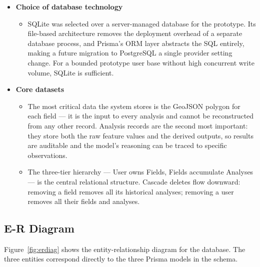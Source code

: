 \begin{itemize}
  \item \textbf{Choice of database technology}
    \begin{itemize}
      \item[-] SQLite was selected over a server-managed database for the prototype. Its file-based architecture removes the deployment overhead of a separate database process, and Prisma's ORM layer abstracts the SQL entirely, making a future migration to PostgreSQL a single provider setting change. For a bounded prototype user base without high concurrent write volume, SQLite is sufficient. \citep{prisma2023}
    \end{itemize}

  \item \textbf{Core datasets}
    \begin{itemize}
      \item[-] The most critical data the system stores is the GeoJSON polygon for each field — it is the input to every analysis and cannot be reconstructed from any other record. Analysis records are the second most important: they store both the raw feature values and the derived outputs, so results are auditable and the model's reasoning can be traced to specific observations.
      \item[-] The three-tier hierarchy — User owns Fields, Fields accumulate Analyses — is the central relational structure. Cascade deletes flow downward: removing a field removes all its historical analyses; removing a user removes all their fields and analyses.
    \end{itemize}
\end{itemize}

\subsection{E-R Diagram}

Figure~\ref{fig:erdiag} shows the entity-relationship diagram for the database. The three entities correspond directly to the three Prisma models in the schema.

